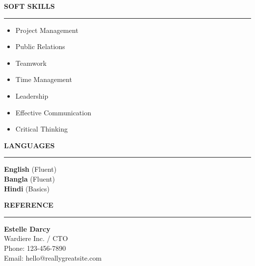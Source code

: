 \documentclass[10pt, a4paper]{scrartcl}
\newcommand{\sidebarsection}[1]{%
    \vspace{6pt}\color{TextWhite}\normalfont\large\bfseries\MakeUppercase{#1}\par\vspace{2pt}%
    \color{TextWhite}\rule{0.9\linewidth}{0.5pt}%
    \vspace{4pt}
}
\begin{document}
\begin{minipage}[t]{0.28\textwidth}
{\begin{minipage}[t]{\linewidth}
            \sidebarsection{SOFT SKILLS}
            \begin{itemize}[label=\color{TextWhite}\tiny\textbullet, noitemsep, topsep=2pt, parsep=0pt, leftmargin=1em]
                \color{TextWhite} \footnotesize
                \item Project Management
                \item Public Relations
                \item Teamwork
                \item Time Management
                \item Leadership
                \item Effective Communication
                \item Critical Thinking
            \end{itemize}
            \vspace{10pt}

            \sidebarsection{LANGUAGES}
            \begin{flushleft}
                \color{TextWhite} \footnotesize
                \textbf{English} (Fluent) \\
                \textbf{Bangla} (Fluent) \\
                \textbf{Hindi} (Basics) \\
            \end{flushleft}
            \vspace{10pt}

            \sidebarsection{REFERENCE}
            \begin{flushleft}
                \color{TextWhite} \footnotesize
                \textbf{Estelle Darcy} \\
                Wardiere Inc. / CTO \\
                Phone: 123-456-7890 \\
                Email: hello@reallygreatsite.com \\
                \vspace{5pt}

            \end{flushleft}
            \vspace{0pt}

        \end{minipage}
    }
\end{minipage}%
\hfill%
\end{document}
